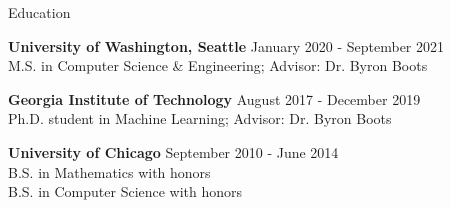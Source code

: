 \documentclass{resume} %
\begin{document}
\begin{rSection}{Education}

{\bf University of Washington, Seattle} \hfill {January 2020 - September 2021} \\
M.S. in Computer Science \& Engineering; Advisor: Dr. Byron Boots

{\bf Georgia Institute of Technology} \hfill {August 2017 - December 2019} \\
Ph.D. student in Machine Learning; Advisor: Dr. Byron Boots

{\bf University of Chicago} \hfill {September 2010 - June 2014} \\
B.S. in Mathematics with honors \\
B.S. in Computer Science with honors

\end{rSection}
\end{document}

